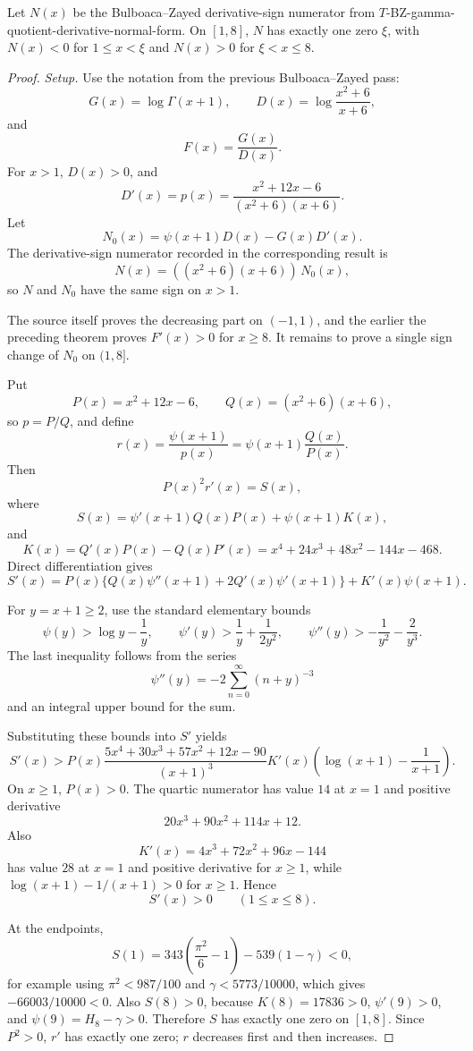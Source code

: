 \begin{proposition}
\label{res:bz-gamma-quotient-n-single-crossing-one-eight}
Let \(N(x)\) be the Bulboaca--Zayed derivative-sign numerator from \(T\)-BZ-gamma-quotient-derivative-normal-form. On \([1,8]\), \(N\) has exactly one zero \(\xi\), with \(N(x)<0\) for \(1\le x<\xi\) and \(N(x)>0\) for \(\xi<x\le8\).
\end{proposition}
\begin{proof}
\emph{Setup.}
Use the notation from the previous Bulboaca--Zayed pass:
\[
G(x)=\log\Gamma(x+1),\qquad
D(x)=\log\frac{x^2+6}{x+6},
\]
and
\[
F(x)=\frac{G(x)}{D(x)}.
\]
For \(x>1\), \(D(x)>0\), and
\[
D'(x)=p(x)=\frac{x^2+12x-6}{(x^2+6)(x+6)}.
\]
Let
\[
N_0(x)=\psi(x+1)D(x)-G(x)D'(x).
\]
The derivative-sign numerator recorded in
the corresponding result is
\[
N(x)=((x^2+6)(x+6))\,N_0(x),
\]
so \(N\) and \(N_0\) have the same sign on \(x>1\).

The source itself proves the decreasing part on \((-1,1)\), and the earlier
the preceding theorem proves \(F'(x)>0\) for
\(x\ge8\).  It remains to prove a single sign change of \(N_0\) on \((1,8]\).

Put
\[
P(x)=x^2+12x-6,\qquad Q(x)=(x^2+6)(x+6),
\]
so \(p=P/Q\), and define
\[
r(x)=\frac{\psi(x+1)}{p(x)}=\psi(x+1)\frac{Q(x)}{P(x)}.
\]
Then
\[
P(x)^2r'(x)=S(x),
\]
where
\[
S(x)=\psi'(x+1)Q(x)P(x)+\psi(x+1)K(x),
\]
and
\[
K(x)=Q'(x)P(x)-Q(x)P'(x)
=x^4+24x^3+48x^2-144x-468.
\]
Direct differentiation gives
\[
S'(x)=P(x)\{Q(x)\psi''(x+1)+2Q'(x)\psi'(x+1)\}+K'(x)\psi(x+1).
\]

For \(y=x+1\ge2\), use the standard elementary bounds
\[
\psi(y)>\log y-\frac1y,\qquad
\psi'(y)>\frac1y+\frac{1}{2y^2},\qquad
\psi''(y)>-\frac1{y^2}-\frac2{y^3}.
\]
The last inequality follows from the series
\[
\psi''(y)=-2\sum_{n=0}^{\infty}(n+y)^{-3}
\]
and an integral upper bound for the sum.

Substituting these bounds into \(S'\) yields
\[
S'(x)>
P(x)\frac{5x^4+30x^3+57x^2+12x-90}{(x+1)^3}
K'(x)\left(\log(x+1)-\frac1{x+1}\right).
\]
On \(x\ge1\), \(P(x)>0\).  The quartic numerator has value \(14\) at \(x=1\)
and positive derivative
\[
20x^3+90x^2+114x+12.
\]
Also
\[
K'(x)=4x^3+72x^2+96x-144
\]
has value \(28\) at \(x=1\) and positive derivative for \(x\ge1\), while
\(\log(x+1)-1/(x+1)>0\) for \(x\ge1\).  Hence
\[
S'(x)>0\qquad(1\le x\le8).
\]

At the endpoints,
\[
S(1)=343\left(\frac{\pi^2}{6}-1\right)-539(1-\gamma)<0,
\]
for example using \(\pi^2<987/100\) and \(\gamma<5773/10000\), which gives
\(-66003/10000<0\).  Also \(S(8)>0\), because \(K(8)=17836>0\),
\(\psi'(9)>0\), and \(\psi(9)=H_8-\gamma>0\).  Therefore \(S\) has exactly
one zero on \([1,8]\).  Since \(P^2>0\), \(r'\) has exactly one zero; \(r\)
decreases first and then increases.


\end{proof}
